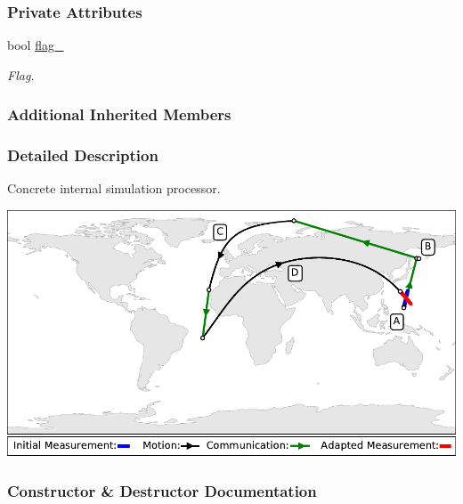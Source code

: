 \subsubsection*{Private Attributes}
\begin{DoxyCompactItemize}
\item 
\mbox{\label{classosse_1_1collaborate_1_1_scheduler_alpha_a98ad63ff3f5454a21f08296db3d6fc6d}} 
bool \hyperlink{classosse_1_1collaborate_1_1_scheduler_alpha_a98ad63ff3f5454a21f08296db3d6fc6d}{flag\+\_\+}
\begin{DoxyCompactList}\small\item\em Flag. \end{DoxyCompactList}\end{DoxyCompactItemize}
\subsubsection*{Additional Inherited Members}


\subsubsection{Detailed Description}
Concrete internal simulation processor. 

 
\begin{DoxyImageNoCaption}
  \mbox{\includegraphics[width=\textwidth]{collaborate}}
\end{DoxyImageNoCaption}
 

\subsubsection{Constructor \& Destructor Documentation}
\mbox{\label{classosse_1_1collaborate_1_1_scheduler_alpha_abf962f131875a1091699fe16a4d0eeb8}} 
